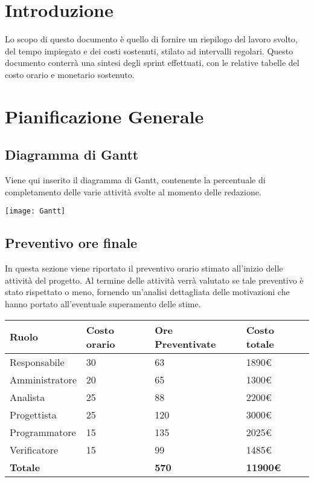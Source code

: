 \documentclass[12pt]{article}
\begin{document}
\section{Introduzione}
Lo scopo di questo documento è quello di fornire un riepilogo del lavoro svolto, del tempo impiegato e dei costi sostenuti, stilato ad intervalli regolari.
Questo documento conterrà una sintesi degli sprint effettuati, con le relative tabelle del costo orario e monetario sostenuto.

\section{Pianificazione Generale}
\subsection{Diagramma di Gantt}
Viene qui inserito il diagramma di Gantt, contenente la percentuale di completamento delle varie attività svolte al momento delle redazione.
\begin{center}
\texttt{[image: Gantt]}
\end{center}

\subsection{Preventivo ore finale}
In questa sezione viene riportato il preventivo orario stimato all'inizio delle attività del progetto. Al termine delle attività verrà valutato se tale preventivo è stato rispettato o meno, fornendo un'analisi dettagliata delle motivazioni che hanno portato all'eventuale superamento delle stime.
\begin{center}  
    \begin{tabular}{|l|l|l|l|}
        \hline
        \textbf{Ruolo} & \textbf{Costo orario} & \textbf{Ore Preventivate} & \textbf{Costo totale}\\
        \hline
        Responsabile & 30 & 63 & 1890\euro  \\ 
        \hline
        Amministratore & 20 & 65 & 1300\euro \\
        \hline
        Analista & 25 & 88 & 2200\euro \\
        \hline
        Progettista & 25 & 120 & 3000\euro \\
        \hline
        Programmatore & 15 & 135 & 2025\euro \\
        \hline
        Verificatore & 15 & 99 & 1485\euro \\
        \hline
        \textbf{Totale} &  & \textbf{570} & \textbf{11900\euro} \\
        \hline
    \end{tabular}
\end{center}
\end{document}
